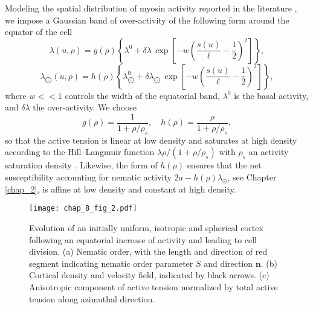 {Modeling the spatial distribution of myosin activity reported in the literature \cite{levayer2012, bement2005, yoshizaki2003}, we impose a Gaussian band of over-activity of the following form around the equator of the cell
\begin{equation}   \label{74_III}
 \lambda(u,\rho)=  g(\rho) \left\{\lambda^0 +  \delta\lambda \, \exp \left[-w\left(\frac{s(u)}{\ell}-\frac{1}{2}\right)^2 \right]\right\} ,
 \end{equation}
\begin{equation}   \label{75_III}
 \lambda_{\bigodot}(u,\rho)=  h(\rho) \left\{\lambda_{\bigodot}^0 +  \delta\lambda_{\bigodot} \, \exp \left[-w\left(\frac{s(u)}{\ell}-\frac{1}{2}\right)^2 \right]\right\} ,
\end{equation}
where $w<<1$ controls the width of the equatorial band,  $\lambda^0$ is the basal activity, and $\delta \lambda$ the over-activity. We choose 
\begin{equation} \label{76_III}
    g(\rho) = \frac{1}{1+\rho/\rho_s} , \quad   h(\rho)  = \frac{\rho}{1+\rho/\rho_s},
\end{equation}
so that the active tension is linear at low density and saturates at high density according to the Hill–Langmuir function  $\lambda\rho / (1+\rho/\rho_s)$ with $\rho_s$ an activity saturation density \cite{bois2011, kumar2014}. Likewise, the form of $h(\rho)$ ensures that the net susceptibility accounting for nematic activity $2a - h(\rho) \lambda_{\odot}$, see Chapter \ref{chap_2}, is affine at low density and constant at high density.

\begin{figure}[h!]
\centering
\vspace*{-0.5cm}\texttt{[image: chap\_8\_fig\_2.pdf]}
\caption{Evolution of an initially uniform, isotropic and spherical cortex following an equatorial increase of activity and leading to cell division. (a) Nematic order, with the length and direction of red segment indicating nematic order parameter $S$ and direction $\bm{n}$. (b) Cortical density and velocity field, indicated by black arrows. (c) Anisotropic component of active tension normalized by total active tension along azimuthal direction. }
\label{fig_2_III}
\end{figure} 


}
